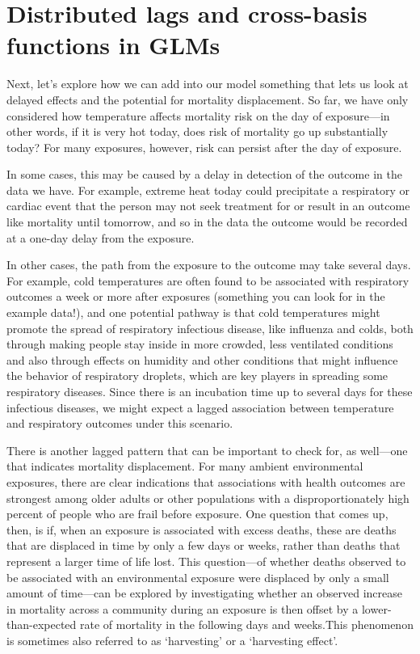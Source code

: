 \documentclass[
]{book}
\begin{document}
\section{Distributed lags and cross-basis functions in GLMs}\label{distributed-lags-and-cross-basis-functions-in-glms}

Next, let's explore how we can add into our model something that lets us look at
delayed effects and the potential for mortality displacement. So far, we have only
considered how temperature affects mortality risk on the day of exposure---in other
words, if it is very hot today, does risk of mortality go up substantially today?
For many exposures, however, risk can persist after the day of exposure.

In some cases, this may be caused by a delay in detection of the outcome in the
data we have. For example, extreme heat today could precipitate a respiratory or
cardiac event that the person may not seek treatment for or result in an outcome
like mortality until tomorrow, and so in the data the outcome would be recorded
at a one-day delay from the exposure.

In other cases, the path from the exposure to the outcome may take several days.
For example, cold temperatures are often found to be associated with respiratory
outcomes a week or more after exposures (something you can look for in the
example data!), and one potential pathway is that cold temperatures might
promote the spread of respiratory infectious disease, like influenza and colds,
both through making people stay inside in more crowded, less ventilated
conditions and also through effects on humidity and other conditions that might
influence the behavior of respiratory droplets, which are key players in
spreading some respiratory diseases. Since there is an incubation time up to
several days for these infectious diseases, we might expect a lagged association
between temperature and respiratory outcomes under this scenario.

There is another lagged pattern that can be important to check for, as well---one
that indicates mortality displacement. For many ambient environmental exposures,
there are clear indications that associations with health outcomes are strongest
among older adults or other populations with a disproportionately high percent
of people who are frail before exposure. One question that comes up, then, is
if, when an exposure is associated with excess deaths, these are deaths that are
displaced in time by only a few days or weeks, rather than deaths that represent
a larger time of life lost. This question---of whether deaths observed to be
associated with an environmental exposure were displaced by only a small amount of
time---can be explored by investigating whether an observed increase in mortality
across a community during an exposure is then offset by a lower-than-expected
rate of mortality in the following days and weeks.This phenomenon is sometimes
also referred to as `harvesting' or a `harvesting effect'.
\end{document}
